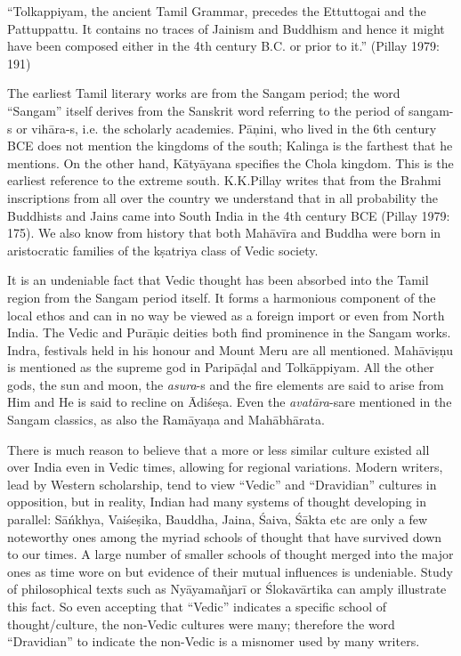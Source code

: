 \begin{myquote}
“Tolkappiyam, the ancient Tamil Grammar, precedes the Ettuttogai and the Pattuppattu. It contains no traces of Jainism and Buddhism and hence it might have been composed either in the 4th century B.C. or prior to it.” (Pillay 1979: 191)
\end{myquote}

The earliest Tamil literary works are from the Sangam period; the word “Sangam” itself derives from the Sanskrit word referring to the period of sangam-s or vihāra-s, i.e. the scholarly academies. Pāņini, who lived in the 6th century BCE does not mention the kingdoms of the south; Kalinga is the farthest that he mentions. On the other hand, Kātyāyana specifies the Chola kingdom. This is the earliest reference to the extreme south. K.K.Pillay writes that from the Brahmi inscriptions from all over the country we understand that in all probability the Buddhists and Jains came into South India in the 4th century BCE (Pillay 1979: 175). We also know from history that both Mahāvīra and Buddha were born in aristocratic families of the kṣatriya class of Vedic society.

It is an undeniable fact that Vedic thought has been absorbed into the Tamil region from the Sangam period itself. It forms a harmonious component of the local ethos and can in no way be viewed as a foreign import or even from North India. The Vedic and Purāņic deities both find prominence in the Sangam works. Indra, festivals held in his honour and Mount Meru are all mentioned. Mahāviṣņu is mentioned as the supreme god in Paripāḍal and Tolkāppiyam. All the other gods, the sun and moon, the \textit{asura}-s and the fire elements are said to arise from Him and He is said to recline on Ādiśeṣa. Even the \textit{avatāra}-s\break are mentioned in the Sangam classics, as also the Ramāyaņa and Mahābhārata.

There is much reason to believe that a more or less similar culture existed all over India even in Vedic times, allowing for regional variations. Modern writers, lead by Western scholarship, tend to view “Vedic” and “Dravidian” cultures in opposition, but in reality, Indian had many systems of thought developing in parallel: Sāńkhya, Vaiśeṣika, Bauddha, Jaina, Śaiva, Śākta etc are only a few noteworthy ones among the myriad schools of thought that have survived down to our times. A large number of smaller schools of thought merged into the major ones as time wore on but evidence of their mutual influences is undeniable. Study of philosophical texts such as Nyāyamañjarī or Ślokavārtika can amply illustrate this fact. So even accepting that “Vedic” indicates a specific school of thought/culture, the non-Vedic cultures were many; therefore the word “Dravidian” to indicate the non-Vedic is a misnomer used by many writers.

